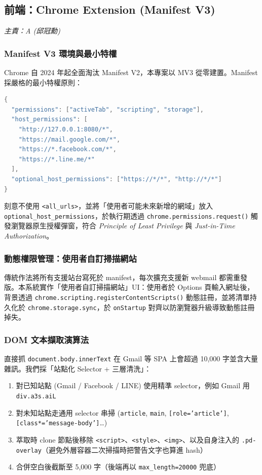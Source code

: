 \documentclass[11pt, a4paper]{article}
\begin{document}
\subsection{前端：Chrome Extension (Manifest V3)} \label{sec:frontend}
\textit{主責：A (邱冠勳)}

\subsubsection{Manifest V3 環境與最小特權}
Chrome 自 2024 年起全面淘汰 Manifest V2，本專案以 MV3 從零建置。Manifest 採嚴格的最小特權原則：

\begin{lstlisting}[language=java, caption={\texttt{manifest.json} 權限設計}]
{
  "permissions": ["activeTab", "scripting", "storage"],
  "host_permissions": [
    "http://127.0.0.1:8080/*",
    "https://mail.google.com/*",
    "https://*.facebook.com/*",
    "https://*.line.me/*"
  ],
  "optional_host_permissions": ["https://*/*", "http://*/*"]
}
\end{lstlisting}

刻意不使用 \texttt{<all\_urls>}，並將「使用者可能未來新增的網域」放入 \texttt{optional\_host\_permissions}，於執行期透過 \texttt{chrome.permissions.request()} 觸發瀏覽器原生授權彈窗，符合 \textit{Principle of Least Privilege} 與 \textit{Just-in-Time Authorization}\cite{nielsen1994}。

\subsubsection{動態權限管理：使用者自訂掃描網站}\label{sec:dynperm}
傳統作法將所有支援站台寫死於 manifest，每次擴充支援新 webmail 都需重發版。本系統實作「使用者自訂掃描網站」UI：使用者於 Options 頁輸入網址後，背景透過 \texttt{chrome.scripting.\allowbreak registerContentScripts()} 動態註冊，並將清單持久化於 \texttt{chrome.storage.sync}，於 \texttt{onStartup} 對齊以防瀏覽器升級導致動態註冊掉失。

\subsubsection{DOM 文本擷取演算法}
直接抓 \texttt{document.body.innerText} 在 Gmail 等 SPA 上會超過 10,000 字並含大量雜訊。我們採「站點化 Selector + 三層清洗」：

\begin{enumerate}[leftmargin=2em]
  \item 對已知站點 (Gmail / Facebook / LINE) 使用精準 selector，例如 Gmail 用 \texttt{div.a3s.aiL}
  \item 對未知站點走通用 selector 串掃 (\texttt{article}, \texttt{main}, \texttt{[role='article']}, \texttt{[class*='message-body']}\ldots)
  \item 萃取時 clone 節點後移除 \texttt{<script>}、\texttt{<style>}、\texttt{<img>}、以及自身注入的 \texttt{.pd-overlay}（避免外層容器二次掃描時把警告文字也算進 hash）
  \item 合併空白後截斷至 5,000 字（後端再以 \texttt{max\_length=20000} 兜底）
\end{enumerate}
\end{document}
